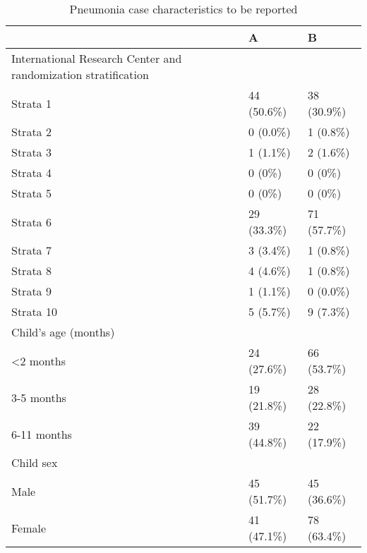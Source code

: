 \documentclass[
]{article}
\begin{document}
\begin{table}[H]

\caption{\label{tab:unnamed-chunk-4}Pneumonia case characteristics to be reported}
\centering
\begin{tabular}[t]{l|l|l}
\hline
  & A & B\\
\hline
International Research Center and randomization stratification &  & \\
\hline
\hspace{1em}Strata 1 & 44 (50.6\%) & 38 (30.9\%)\\
\hline
\hspace{1em}Strata 2 & 0  (0.0\%) & 1  (0.8\%)\\
\hline
\hspace{1em}Strata 3 & 1  (1.1\%) & 2  (1.6\%)\\
\hline
\hspace{1em}Strata 4 & 0 (0\%) & 0 (0\%)\\
\hline
\hspace{1em}Strata 5 & 0 (0\%) & 0 (0\%)\\
\hline
\hspace{1em}Strata 6 & 29 (33.3\%) & 71 (57.7\%)\\
\hline
\hspace{1em}Strata 7 & 3  (3.4\%) & 1  (0.8\%)\\
\hline
\hspace{1em}Strata 8 & 4  (4.6\%) & 1  (0.8\%)\\
\hline
\hspace{1em}Strata 9 & 1  (1.1\%) & 0  (0.0\%)\\
\hline
\hspace{1em}Strata 10 & 5  (5.7\%) & 9  (7.3\%)\\
\hline
Child’s age (months) &  & \\
\hline
\hspace{1em}<2 months & 24 (27.6\%) & 66 (53.7\%)\\
\hline
\hspace{1em}3-5 months & 19 (21.8\%) & 28 (22.8\%)\\
\hline
\hspace{1em}6-11 months & 39 (44.8\%) & 22 (17.9\%)\\
\hline
Child sex &  & \\
\hline
\hspace{1em}Male & 45 (51.7\%) & 45 (36.6\%)\\
\hline
\hspace{1em}Female & 41 (47.1\%) & 78 (63.4\%)\\

\end{tabular}
\end{table}
\end{document}
